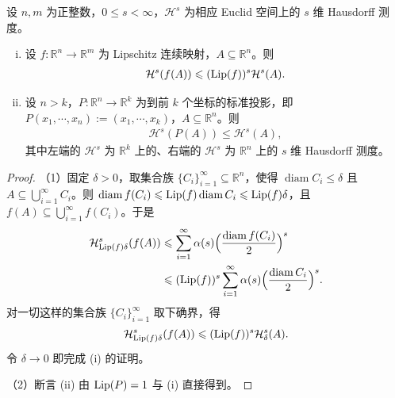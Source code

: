 \documentclass[../../main.tex]{subfiles}%
\begin{document}
\begin{theorem}\label{theorem:ch02-2-8}
设 $n,m$ 为正整数，$0\leqslant s<\infty$，$\mathcal{H}^s$ 为相应 Euclid 空间上的 $s$ 维 Hausdorff 测度。
\begin{enumerate}[(i)]
\item 设 $f:\mathbb{R}^n\to\mathbb{R}^m$ 为 Lipschitz 连续映射，$A\subseteq\mathbb{R}^n$。则
\begin{align*}
\mathcal{H}^s(f(A))\leqslant(\operatorname{Lip}(f))^s\mathcal{H}^s(A).
\end{align*}
\item 设 $n>k$，$P:\mathbb{R}^n\to\mathbb{R}^k$ 为到前 $k$ 个坐标的标准投影，即 $P(x_1,\cdots,x_n):=(x_1,\cdots,x_k)$，$A\subseteq\mathbb{R}^n$。则
\begin{align*}
\mathcal{H}^s(P(A))\leqslant\mathcal{H}^s(A),
\end{align*}
其中左端的 $\mathcal{H}^s$ 为 $\mathbb{R}^k$ 上的、右端的 $\mathcal{H}^s$ 为 $\mathbb{R}^n$ 上的 $s$ 维 Hausdorff 测度。
\end{enumerate}
\end{theorem}

\begin{proof}
（1）固定 $\delta>0$，取集合族 $\{C_i\}_{i=1}^{\infty}\subseteq\mathbb{R}^n$，使得 $\operatorname{diam}C_i\leqslant\delta$ 且 $A\subseteq\bigcup_{i=1}^{\infty}C_i$。则 $\operatorname{diam}f(C_i)\leqslant\operatorname{Lip}(f)\operatorname{diam}C_i\leqslant\operatorname{Lip}(f)\delta$，且 $f(A)\subseteq\bigcup_{i=1}^{\infty}f(C_i)$。于是
\begin{align*}
\mathcal{H}^s_{\operatorname{Lip}(f)\delta}(f(A))
&\leqslant\sum_{i=1}^{\infty}\alpha(s)\Bigl(\frac{\operatorname{diam}f(C_i)}{2}\Bigr)^s\\
&\leqslant(\operatorname{Lip}(f))^s\sum_{i=1}^{\infty}\alpha(s)\Bigl(\frac{\operatorname{diam}C_i}{2}\Bigr)^s .
\end{align*}
对一切这样的集合族 $\{C_i\}_{i=1}^{\infty}$ 取下确界，得
\begin{align*}
\mathcal{H}^s_{\operatorname{Lip}(f)\delta}(f(A))\leqslant(\operatorname{Lip}(f))^s\mathcal{H}^s_\delta(A).
\end{align*}
令 $\delta\to0$ 即完成 (i) 的证明。

（2）断言 (ii) 由 $\operatorname{Lip}(P)=1$ 与 (i) 直接得到。
\end{proof}
\end{document}
